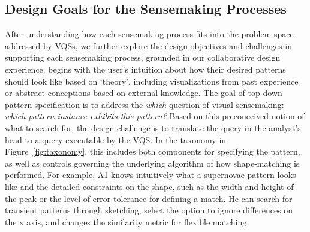 \subsection{Design Goals for the Sensemaking Processes}
After understanding how each sensemaking process fits into the problem space addressed by VQSs, we further explore the design objectives and challenges in supporting each sensemaking process, grounded in our collaborative design experience. %
 begins with the user's intuition
about how their desired patterns should look like based on `theory', including visualizations from past experience or abstract conceptions based on external knowledge. The goal of top-down pattern specification is to address the \textit{which} question of visual sensemaking: \textit{which pattern instance exhibits this pattern?} Based on this preconceived notion of what to search for, the design challenge is to translate the query in the
analyst's head to a query executable by the VQS.
In the taxonomy in Figure~\ref{fig:taxonomy},
this includes both components for specifying the pattern,
as well as controls governing the underlying
algorithm of how shape-matching is performed.
For example, A1 knows intuitively
what a supernovae pattern looks like
and the detailed constraints on the shape,
such as the width and height of the peak
or the level of error tolerance for defining a match.
He can search for transient patterns through sketching,
select the option to ignore differences
on the x axis, and changes the similarity metric for flexible matching.  %
